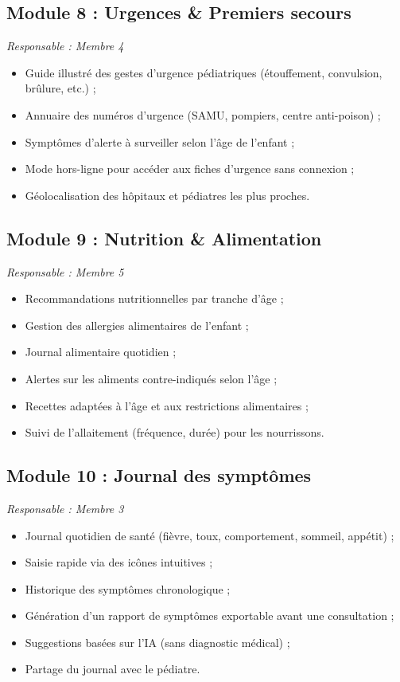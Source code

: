 \documentclass[11pt,a4paper]{article}
\begin{document}
\subsection{Module 8 : Urgences \& Premiers secours}

\textit{Responsable : Membre 4}

\begin{itemize}
  \item Guide illustré des gestes d'urgence pédiatriques (étouffement, convulsion, brûlure, etc.) ;
  \item Annuaire des numéros d'urgence (SAMU, pompiers, centre anti-poison) ;
  \item Symptômes d'alerte à surveiller selon l'âge de l'enfant ;
  \item Mode hors-ligne pour accéder aux fiches d'urgence sans connexion ;
  \item Géolocalisation des hôpitaux et pédiatres les plus proches.
\end{itemize}

\subsection{Module 9 : Nutrition \& Alimentation}

\textit{Responsable : Membre 5}

\begin{itemize}
  \item Recommandations nutritionnelles par tranche d'âge ;
  \item Gestion des allergies alimentaires de l'enfant ;
  \item Journal alimentaire quotidien ;
  \item Alertes sur les aliments contre-indiqués selon l'âge ;
  \item Recettes adaptées à l'âge et aux restrictions alimentaires ;
  \item Suivi de l'allaitement (fréquence, durée) pour les nourrissons.
\end{itemize}

\subsection{Module 10 : Journal des symptômes}

\textit{Responsable : Membre 3}

\begin{itemize}
  \item Journal quotidien de santé (fièvre, toux, comportement, sommeil, appétit) ;
  \item Saisie rapide via des icônes intuitives ;
  \item Historique des symptômes chronologique ;
  \item Génération d'un rapport de symptômes exportable avant une consultation ;
  \item Suggestions basées sur l'IA (sans diagnostic médical) ;
  \item Partage du journal avec le pédiatre.
\end{itemize}
\end{document}
